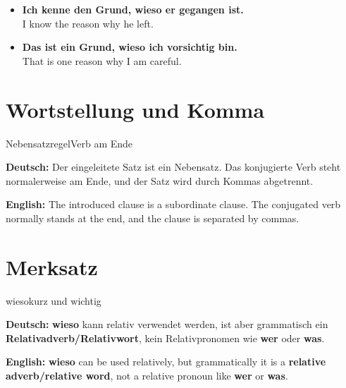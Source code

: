 \documentclass[a4paper,11pt]{article}
\newcommand{\GermanText}[1]{\textbf{Deutsch: }#1\par}
\newcommand{\EnglishText}[1]{{\small\color{SoftGray}\textbf{English: }#1\par}}
\newcommand{\ExampleItem}[2]{\item \textbf{#1}\\{\small\color{SoftGray}#2}}
\begin{document}
\begin{exbox}

\begin{itemize}

\ExampleItem{Ich kenne den Grund, wieso er gegangen ist.}{I know the reason why he left.}

\ExampleItem{Das ist ein Grund, wieso ich vorsichtig bin.}{That is one reason why I am careful.}

\end{itemize}

\end{exbox}

\section{Wortstellung und Komma}

\begin{grammarentry}{Nebensatzregel}{Verb am Ende}

\GermanText{Der eingeleitete Satz ist ein Nebensatz. Das konjugierte Verb steht normalerweise am Ende, und der Satz wird durch Kommas abgetrennt.}

\EnglishText{The introduced clause is a subordinate clause. The conjugated verb normally stands at the end, and the clause is separated by commas.}

\end{grammarentry}

\section{Merksatz}

\begin{grammarentry}{wieso}{kurz und wichtig}

\GermanText{\textbf{wieso} kann relativ verwendet werden, ist aber grammatisch ein \textbf{Relativadverb/Relativwort}, kein Relativpronomen wie \textbf{wer} oder \textbf{was}.}

\EnglishText{\textbf{wieso} can be used relatively, but grammatically it is a \textbf{relative adverb/relative word}, not a relative pronoun like \textbf{wer} or \textbf{was}.}

\end{grammarentry}
\end{document}
